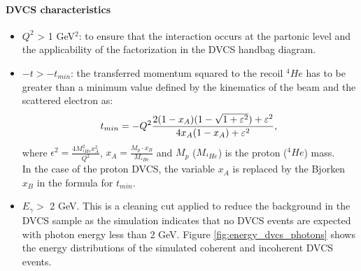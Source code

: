 \paragraph{DVCS characteristics}
\begin{itemize}
\item $Q^{2}$ > 1 GeV$^{2}$: to ensure that the interaction occurs at the partonic level and the applicability of the factorization in the DVCS  handbag diagram.
\item $ -t > -t_{min}$: the transferred momentum squared to the recoil $^{4}He$ has to be greater than a minimum value defined by the kinematics of the beam and the scattered electron as:
\begin{equation}
   t_{min} = - Q^{2} \frac{2(1- x_{A})(1 - \sqrt{1 + \epsilon ^{2}}) + \epsilon 
   ^{2}}{4 x_{A}(1-x_{A})+ \epsilon ^{2}},\\
\end{equation}
where $\epsilon ^{2} = \frac{4M^{2}_{^4He}x^{2}_{A}}{Q^{2}}$, $x_{A} = \frac{M_{p}\cdot x_{B}}{M_{^4He}}$ and $M_{p}$ ($M_{^4He}$) is the proton ($^{4}He$) mass.\\

In the case of the proton DVCS, the variable $x_{A}$ is replaced by the Bjorken $x_{B}$ in the formula for $t_{min}$.

\item $E_{\gamma}>$ 2 GeV. This is a cleaning cut applied to reduce the 
   background in the DVCS sample as the simulation indicates that no DVCS 
   events are expected with photon energy less than 2 GeV. Figure 
   \ref{fig:energy_dvcs_photons} shows the energy distributions of the 
   simulated coherent and incoherent DVCS events.


\end{itemize}
